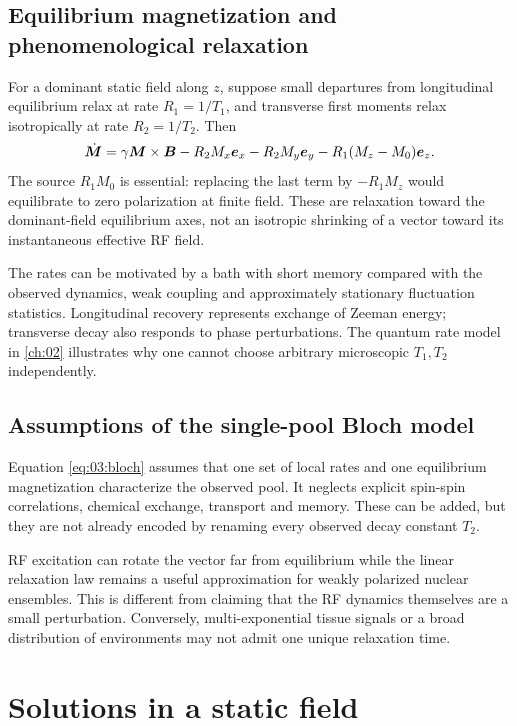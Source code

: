 \subsection{Equilibrium magnetization and phenomenological relaxation}
For a dominant static field along $z$, suppose small departures from
longitudinal equilibrium relax at rate $R_1=1/T_1$, and transverse
first moments relax isotropically at rate $R_2=1/T_2$.
Then
\begin{equation}
 \dot{\bm{M}}
 =\gamma\bm{M}\times\bm{B}
 -R_2M_x\bm{e}_x-R_2M_y\bm{e}_y
 -R_1(M_z-M_0)\bm{e}_z .
 \label{eq:03:bloch}
\end{equation}
The source $R_1M_0$ is essential: replacing the last term by $-R_1M_z$
would equilibrate to zero polarization at finite field.
These are relaxation toward the dominant-field equilibrium axes, not
an isotropic shrinking of a vector toward its instantaneous effective
RF field.

The rates can be motivated by a bath with short memory compared with
the observed dynamics, weak coupling and approximately stationary
fluctuation statistics. Longitudinal recovery represents exchange of
Zeeman energy; transverse decay also responds to phase perturbations.
The quantum rate model in \cref{ch:02} illustrates why one cannot choose
arbitrary microscopic $T_1,T_2$ independently.

\subsection{Assumptions of the single-pool Bloch model}
Equation \eqref{eq:03:bloch} assumes that one set of local rates and one
equilibrium magnetization characterize the observed pool.
It neglects explicit spin-spin correlations, chemical exchange, transport
and memory. These can be added, but they are not already encoded by
renaming every observed decay constant $T_2$.

RF excitation can rotate the vector far from equilibrium while the
linear relaxation law remains a useful approximation for weakly polarized
nuclear ensembles. This is different from claiming that the RF dynamics
themselves are a small perturbation. Conversely, multi-exponential
tissue signals or a broad distribution of environments may not admit
one unique relaxation time.

\section{Solutions in a static field}
\label{sec:03:solutions-in-a-static-field}
